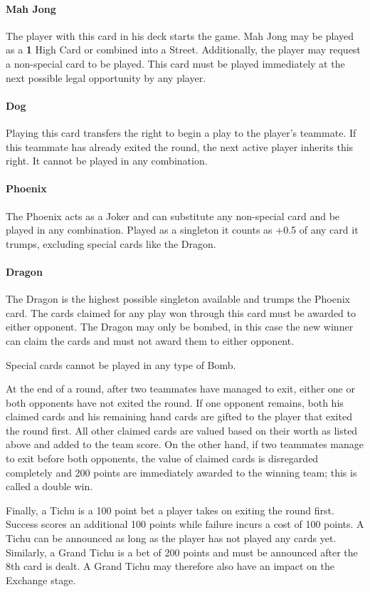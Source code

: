 \paragraph*{Mah Jong}
The player with this card in his deck starts the game. Mah Jong may be played as a \textbf{1} High Card or combined into a Street. Additionally, the player may request a non-special card to be played. This card must be played immediately at the next possible legal opportunity by any player.
\paragraph*{Dog}
Playing this card transfers the right to begin a play to the player’s teammate. If this teammate has already exited the round, the next active player inherits this right. It cannot be played in any combination.
\paragraph*{Phoenix}
The Phoenix acts as a Joker and can substitute any non-special card and be played in any combination. Played as a singleton it counts as +0.5 of any card it trumps, excluding special cards like the Dragon.
\paragraph{Dragon}
The Dragon is the highest possible singleton available and trumps the Phoenix card. The cards claimed for any play won through this card must be awarded to either opponent. The Dragon may only be bombed, in this case the new winner can claim the cards and must not award them to either opponent.

Special cards cannot be played in any type of Bomb.

At the end of a round, after two teammates have managed to exit, either one or both opponents have not exited the round. If one opponent remains, both his claimed cards and his remaining hand cards are gifted to the player that exited the round first. All other claimed cards are valued based on their worth as listed above and added to the team score. On the other hand, if two teammates manage to exit before both opponents, the value of claimed cards is disregarded completely and 200 points are immediately awarded to the winning team; this is called a double win.

Finally, a Tichu is a 100 point bet a player takes on exiting the round first. Success scores an additional 100 points while failure incurs a cost of 100 points. A Tichu can be announced as long as the player has not played any cards yet. Similarly, a Grand Tichu is a bet of 200 points and must be announced after the 8th card is dealt. A Grand Tichu may therefore also have an impact on the Exchange stage.

